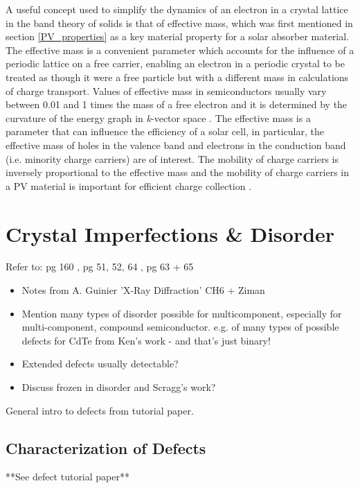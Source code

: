A useful concept used to simplify the dynamics of an electron in a crystal lattice in the band theory of solids is that of effective mass, which was first mentioned in section \ref{PV_properties} as a key material property for a solar absorber material. The effective mass is a convenient parameter which accounts for the influence of a periodic lattice on a free carrier, enabling an electron in a periodic crystal to be treated as though it were a free particle but with a different mass in calculations of charge transport. Values of effective mass in semiconductors usually vary between 0.01 and 1 times the mass of a free electron and it is determined by the curvature of the energy graph in \textit{k}-vector space \cite{small_semiconductor2}. The effective mass is a parameter that can influence the efficiency of a solar cell, in particular, the effective mass of holes in the valence band and electrons in the conduction band (i.e. minority charge carriers) are of interest. The mobility of charge carriers is inversely proportional to the effective mass and the mobility of charge carriers in a PV material is important for efficient charge collection \cite{transport}.
 
 
 
\section{Crystal Imperfections \& Disorder}
Refer to: pg 160 \cite{fund_semi}, pg 51, 52, 64 \cite{thin_film_Boer}, pg 63 + 65 \cite{phys_semicond}\\

\begin{itemize}
\item Notes from A. Guinier 'X-Ray Diffraction' CH6 + Ziman
\item Mention many types of disorder possible for multicomponent, especially for multi-component, compound semiconductor. e.g. of many types of possible defects for CdTe from Ken's work - and that's just binary!
\item Extended defects usually detectable? 
\item Discuss frozen in disorder and Scragg's work?
\end{itemize}


General intro to defects from tutorial paper.



\subsection{Characterization of Defects}
 **See defect tutorial paper**\\

